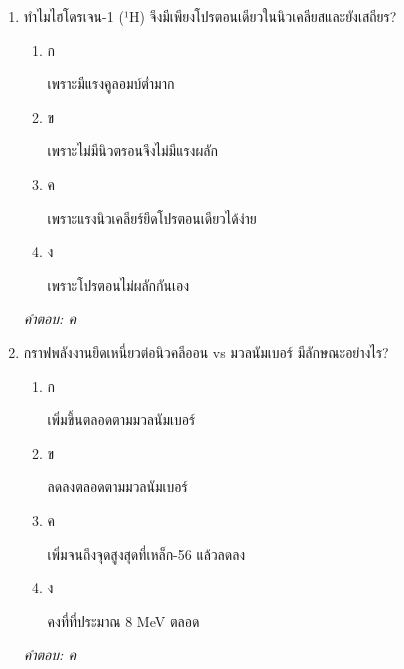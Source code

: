 \documentclass[12pt]{article}
\begin{document}
\begin{enumerate}[label=\arabic*., itemsep=0.5\baselineskip, topsep=0.5\baselineskip, leftmargin=*]
\item ทำไมไฮโดรเจน-1 (¹H) จึงมีเพียงโปรตอนเดียวในนิวเคลียสและยังเสถียร?
\begin{enumerate}[label=\alph*)., itemsep=0.3\baselineskip, topsep=0.3\baselineskip]
\item ก\ 
\begin{minipage}[t]{0.9\linewidth}
\raggedright เพราะมีแรงคูลอมบ์ต่ำมาก
\end{minipage}
\item ข\ 
\begin{minipage}[t]{0.9\linewidth}
\raggedright เพราะไม่มีนิวตรอนจึงไม่มีแรงผลัก
\end{minipage}
\item ค\ 
\begin{minipage}[t]{0.9\linewidth}
\raggedright เพราะแรงนิวเคลียร์ยึดโปรตอนเดียวได้ง่าย
\end{minipage}
\item ง\ 
\begin{minipage}[t]{0.9\linewidth}
\raggedright เพราะโปรตอนไม่ผลักกันเอง
\end{minipage}
\end{enumerate}
\vspace{-0.3\baselineskip}
\begin{small}
\textit{คำตอบ: ค}
\end{small}

\item กราฟพลังงานยึดเหนี่ยวต่อนิวคลีออน vs มวลนัมเบอร์ มีลักษณะอย่างไร?
\begin{enumerate}[label=\alph*)., itemsep=0.3\baselineskip, topsep=0.3\baselineskip]
\item ก\ 
\begin{minipage}[t]{0.9\linewidth}
\raggedright เพิ่มขึ้นตลอดตามมวลนัมเบอร์
\end{minipage}
\item ข\ 
\begin{minipage}[t]{0.9\linewidth}
\raggedright ลดลงตลอดตามมวลนัมเบอร์
\end{minipage}
\item ค\ 
\begin{minipage}[t]{0.9\linewidth}
\raggedright เพิ่มจนถึงจุดสูงสุดที่เหล็ก-56 แล้วลดลง
\end{minipage}
\item ง\ 
\begin{minipage}[t]{0.9\linewidth}
\raggedright คงที่ที่ประมาณ 8 MeV ตลอด
\end{minipage}
\end{enumerate}
\vspace{-0.3\baselineskip}
\begin{small}
\textit{คำตอบ: ค}
\end{small}


\end{enumerate}
\end{document}
